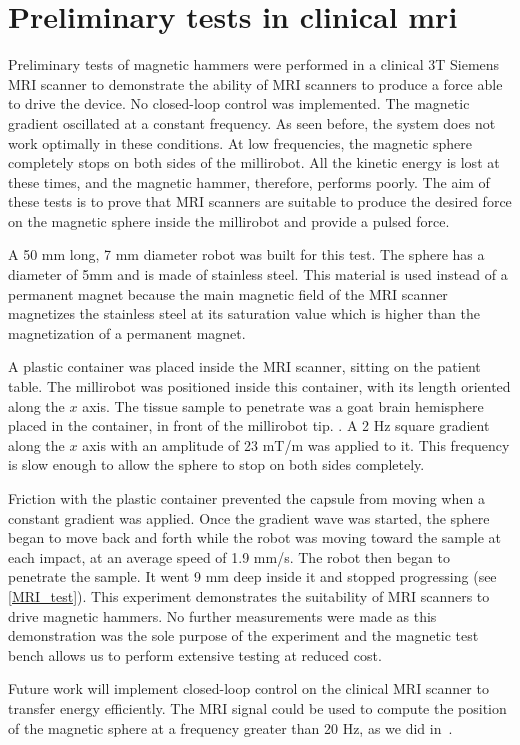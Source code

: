 \documentclass[letterpaper, 10 pt, conference]{ieeeconf}  %
\begin{document}
\section{Preliminary tests in clinical mri}
\label{MRI_tests}
Preliminary tests of magnetic hammers were performed in a clinical 3T Siemens MRI scanner to demonstrate the ability of MRI scanners to produce a force able to drive the device.
No closed-loop control was implemented. 
The magnetic gradient  oscillated at a constant frequency. 
As seen before, the system does not work optimally in these conditions. 
At low frequencies, the magnetic sphere completely stops on both sides of the millirobot. 
All the kinetic energy is lost at these times, and the magnetic hammer, therefore, performs poorly. 
The aim of these tests is to prove that MRI scanners are suitable to produce the desired force on the magnetic sphere inside the millirobot and provide a pulsed force.\par
A 50 mm long, 7 mm diameter robot was built for this test. The sphere has a diameter of 5mm and is made of stainless steel. This material is used instead of a permanent magnet because the main magnetic field of the MRI scanner magnetizes the stainless steel at its saturation value which is higher than the magnetization of a permanent magnet.\par
A plastic container was placed inside the MRI scanner, sitting on the patient table. The millirobot was positioned inside this container, with its length oriented along the $x$ axis. The tissue sample to penetrate was a goat brain hemisphere placed in the container, in front of the millirobot tip. .
A 2 Hz square gradient along the $x$ axis with an amplitude of 23 mT/m was applied to it. 
This frequency is slow enough to allow the sphere to stop on both sides completely. \par
Friction with the plastic container prevented the capsule from moving when a constant gradient was applied. Once the gradient wave was started, the sphere began to move back and forth while the robot was moving toward the sample at each impact, at an average speed of 1.9 mm/s. 
 The robot then began to penetrate the sample. It went 9 mm deep inside it and stopped progressing (see \cref{MRI_test}). 
This experiment demonstrates the suitability of MRI scanners to drive magnetic hammers. No further measurements were made as this demonstration was the sole purpose of the experiment and the magnetic test bench allows us to perform extensive testing at reduced cost.\par
Future work will implement closed-loop control on the clinical MRI scanner to transfer energy efficiently. 
The MRI signal could be used to compute the position of the magnetic sphere at a frequency greater than 20 Hz, as we did in~\cite{578}.
\end{document}
